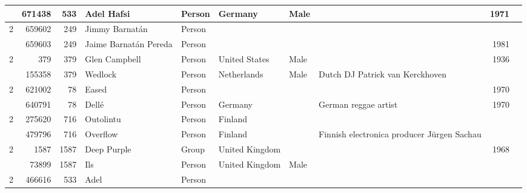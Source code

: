 \begin{tabular}{|r|rrlllllrr|}
         & 671438 &       533 & Adel Hafsi            & Person & Germany        & Male     &                                                   &         1971 &            \\
\hline
\multirow{2}{*}{2} & 659602 &       249 & Jimmy Barnatán        & Person &                &          &                                                   &              &            \\
         & 659603 &       249 & Jaime Barnatán Pereda & Person &                &          &                                                   &         1981 &            \\
\hline
\multirow{2}{*}{2} &    379 &       379 & Glen Campbell         & Person & United States  & Male     &                                                   &         1936 &            \\
         & 155358 &       379 & Wedlock               & Person & Netherlands    & Male     & Dutch DJ Patrick van Kerckhoven                   &              &            \\
\hline
\multirow{2}{*}{2} & 621002 &        78 & Eased                 & Person &                &          &                                                   &         1970 &            \\
         & 640791 &        78 & Dellé                 & Person & Germany        &          & German reggae artist                              &         1970 &            \\
\hline
\multirow{2}{*}{2} & 275620 &       716 & Outolintu             & Person & Finland        &          &                                                   &              &            \\
         & 479796 &       716 & Overflow              & Person & Finland        &          & Finnish electronica producer Jürgen Sachau        &              &            \\
\hline
\multirow{2}{*}{2} &   1587 &      1587 & Deep Purple           & Group  & United Kingdom &          &                                                   &         1968 &            \\
         &  73899 &      1587 & Ils                   & Person & United Kingdom & Male     &                                                   &              &            \\
\hline
\multirow{2}{*}{2} & 466616 &       533 & Adel                  & Person &                &          &                                                   &              &            \\

\end{tabular}
